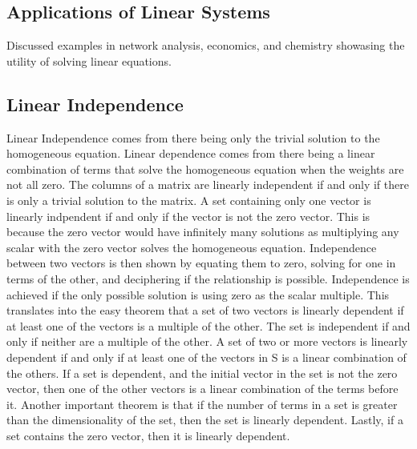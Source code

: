 \documentclass[12pt]{article}
\begin{document}
\subsection{Applications of Linear Systems}
Discussed examples in network analysis, economics, and chemistry showasing the utility of solving linear equations. 
\subsection{Linear Independence}
Linear Independence comes from there being only the trivial solution to the homogeneous equation. Linear dependence comes from there being a linear combination of terms that %
solve the homogeneous equation when the weights are not all zero.
\newline
\newline
The columns of a matrix are linearly independent if and only if there is only a trivial solution to the matrix. A set containing only one vector is linearly indpendent if %
and only if the vector is not the zero vector. This is because the zero vector would have infinitely many solutions as multiplying any scalar with the zero vector solves the %
homogeneous equation. Independence between two vectors is then shown by equating them to zero, solving for one in terms of the other, and deciphering if the relationship %
is possible. Independence is achieved if the only possible solution is using zero as the scalar multiple. This translates into the easy theorem that a set of two vectors is %
linearly dependent if at least one of the vectors is a multiple of the other. The set is independent if and only if neither are a multiple of the other. A set of two or more %
vectors is linearly dependent if and only if at least one of the vectors in S is a linear combination of the others. If a set is dependent, and the initial vector in the set %
is not the zero vector, then one of the other vectors is a linear combination of the terms before it. Another important theorem is that if the number of terms in a set is %
greater than the dimensionality of the set, then the set is linearly dependent. Lastly, if a set contains the zero vector, then it is linearly dependent. 
\newline
\end{document}
